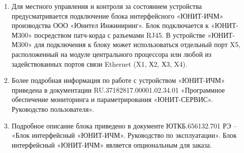 \begin{enumerate}

\noindent
\fboxrule=1.2pt %
\noindent
{}


\end{enumerate}

\color{black}

\begin{enumerate}

\item
Для местного управления и контроля за состоянием устройства предусматривается подключение блока интерфейсного «ЮНИТ-ИЧМ» производства ООО «Юнител Инжиниринг». Блок подключается к «ЮНИТ-М300» посредством патч-корда с разъемами RJ45. В устройстве «ЮНИТ-М300» для подключения к блоку может использоваться отдельный порт X5, расположенный на модуле центрального процессора или любой из задействованных портов связи Ethernet (X1, Х2, Х3, X4).
\item
Более подробная информация по работе с устройством «ЮНИТ-ИЧМ» приведена в документации RU.37182817.00001.02.34.01 «Программное обеспечение мониторинга и параметрирования «ЮНИТ-СЕРВИС». Руководство пользователя».

\item
Подробное описание блока приведено в документе ЮТКБ.656132.701 РЭ – «Блок интерфейсный «ЮНИТ-ИЧМ». Руководство по эксплуатации». Блок интерфейсный «ЮНИТ-ИЧМ» является опциональным для заказа.

\end{enumerate}